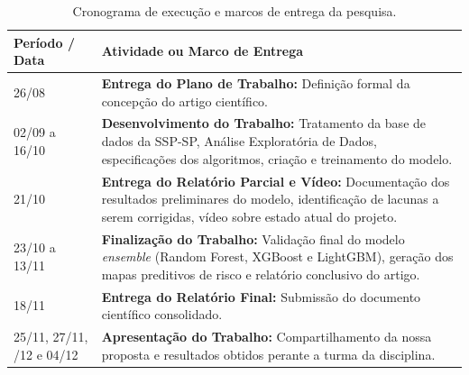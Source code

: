 \documentclass[12pt]{article}
\begin{document}
\begin{table}[htpb]
    \centering
    \caption{Cronograma de execução e marcos de entrega da pesquisa.}
    \label{tab:cronograma}
    \vspace{0.2cm} %
    \begin{tabular}{p{3.5cm} p{11cm}}
        \hline
        \textbf{Período / Data} & \textbf{Atividade ou Marco de Entrega} \\
        \hline
        26/08 & \textbf{Entrega do Plano de Trabalho:} Definição formal da concepção do artigo científico. \\
        
        02/09 a 16/10 & \textbf{Desenvolvimento do Trabalho:} Tratamento da base de dados da SSP-SP, Análise Exploratória de Dados, especificações dos algoritmos, criação e treinamento do modelo. \\
        
        21/10 & \textbf{Entrega do Relatório Parcial e Vídeo:} Documentação dos resultados preliminares do modelo, identificação de lacunas a serem corrigidas, vídeo sobre estado atual do projeto. \\
        
        23/10 a 13/11 & \textbf{Finalização do Trabalho:} Validação final do modelo \textit{ensemble} (Random Forest, XGBoost e LightGBM), geração dos mapas preditivos de risco e relatório conclusivo do artigo. \\
        
        18/11 & \textbf{Entrega do Relatório Final:} Submissão do documento científico consolidado. \\
        
        25/11, 27/11, \newline 02/12 e 04/12 & \textbf{Apresentação do Trabalho:} Compartilhamento da nossa proposta e resultados obtidos perante a turma da disciplina. \\
        \hline
    \end{tabular}
\end{table}


\vspace{1.2cm}



\end{document}
